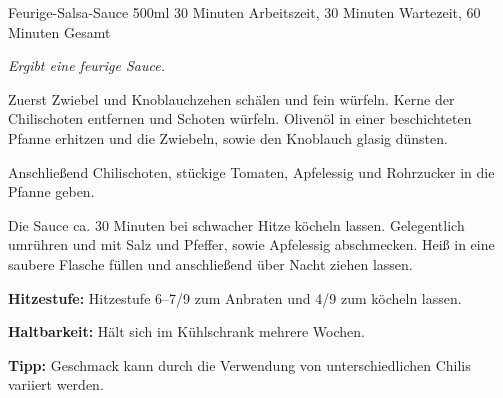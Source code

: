 \begin{recipe}{Feurige-Salsa-Sauce} {500ml} {30 Minuten Arbeitszeit, 30 Minuten Wartezeit, 60 Minuten Gesamt}

  \freeform{}\textit{Ergibt eine feurige Sauce.}


  Zuerst Zwiebel und Knoblauchzehen schälen und fein würfeln.
  Kerne der Chilischoten entfernen und Schoten würfeln.
  Olivenöl in einer beschichteten Pfanne erhitzen und die Zwiebeln, sowie den Knoblauch glasig dünsten.


  Anschließend Chilischoten, stückige Tomaten, Apfelessig und Rohrzucker in die Pfanne geben.


  Die Sauce ca. 30 Minuten bei schwacher Hitze köcheln lassen.
  Gelegentlich umrühren und mit Salz und Pfeffer, sowie Apfelessig abschmecken.
  Heiß in eine saubere Flasche füllen und anschließend über Nacht ziehen lassen.

  \freeform{}\hrulefill{}

  \freeform{}\textbf{Hitzestufe:}
  Hitzestufe 6–7/9 zum Anbraten und 4/9 zum köcheln lassen.

  \freeform{}\textbf{Haltbarkeit:}
  Hält sich im Kühlschrank mehrere Wochen.

  \freeform{}\textbf{Tipp:}
  Geschmack kann durch die Verwendung von unterschiedlichen Chilis variiert werden.

\end{recipe}
